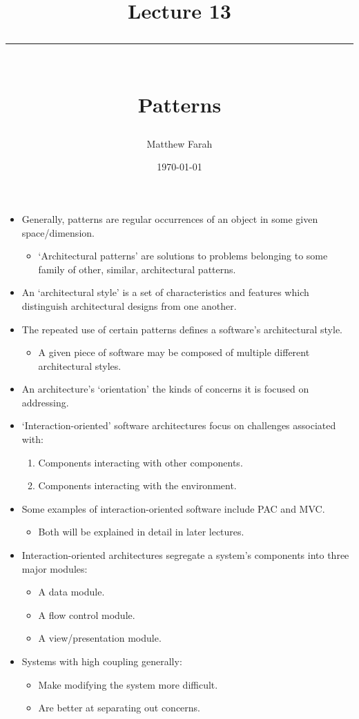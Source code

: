 \documentclass{article}
\date{
	\vspace{-.75em}
	{\large \today}
}
\title{
	\vspace*{-1.5em}
	{\Huge Lecture 13} \\
	\vspace{-1em}
	\rule{\textwidth/4}{.01em} \\
	\vspace{-.25em}
	{\Large Patterns}
	\vspace{-.75em}
}
\author{
	{\large Matthew Farah}
}
\begin{document}
\maketitle
\pagestyle{fancy}

\fi

\begin{itemize}
	\item Generally, patterns are regular occurrences of an object in some given space/dimension.
	\begin{itemize}
		\item `Architectural patterns' are solutions to problems belonging to some family of other, similar, architectural patterns.
	\end{itemize}
	\item An `architectural style' is a set of characteristics and features which distinguish architectural designs from one another.
	\item The repeated use of certain patterns defines a software's architectural style.
	\begin{itemize}
		\item A given piece of software may be composed of multiple different architectural styles.
	\end{itemize}
	\item An architecture's `orientation' the kinds of concerns it is focused on addressing.
	\item `Interaction-oriented' software architectures focus on challenges associated with:
	\begin{enumerate}
		\item Components interacting with other components.
		\item Components interacting with the environment.
	\end{enumerate}
	\item Some examples of interaction-oriented software include PAC and MVC.
	\begin{itemize}
		\item Both will be explained in detail in later lectures.
	\end{itemize}
	\item Interaction-oriented architectures segregate a system's components into three major modules:
	\begin{itemize}
		\item A data module.
		\item A flow control module.
		\item A view/presentation module.
	\end{itemize}
	\item Systems with high coupling generally:
	\begin{itemize}
		\item Make modifying the system more difficult.
		\item Are better at separating out concerns.
	\end{itemize}
\end{itemize}

\ifdefined\iscombined
	\newpage
\else
	
\end{document}
